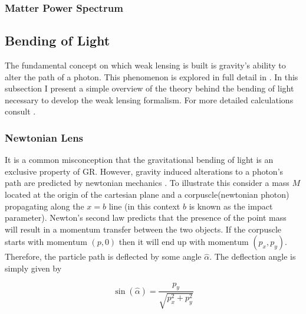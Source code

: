 \subsubsection{Matter Power Spectrum}
\cite{extragalactic}

\subsection{Bending of Light}
The fundamental concept on which weak lensing is built is gravity's ability to alter the path of a photon. This phenomenon is explored in full detail in \cite{GR1,basicLens,Mellier:1998pk}.
In this subsection I present a simple overview of the theory behind the bending of light necessary to develop the weak lensing formalism. For more detailed calculations consult \cite{GR1,basicLens,Mellier:1998pk}.
\subsubsection{Newtonian Lens}
\label{subsec:newtonlens}

It is a common misconception that the gravitational bending of light is an exclusive property of GR.
However, gravity induced alterations to a photon's path are predicted by newtonian mechanics \cite{lensingbook}. To illustrate this 
consider a mass $M$ located at the origin of the cartesian plane and a corpuscle(newtonian photon) 
propagating along the $x=b$ line (in this context $b$ is known as the impact parameter). 
Newton's second law predicts that the presence of the point mass will result in a momentum transfer
between the two objects. If the corpuscle starts with 
momentum $(p,0)$ then it will end up with momentum $(p_x,p_y)$.
Therefore, the particle path is deflected by some angle $\hat{\alpha}$. The deflection angle is 
simply given by 

\begin{equation}
  \sin(\hat{\alpha}) = \frac{p_y}{\sqrt{p_x^2+p_y^2}}
  \label{deflectionnewton}
\end{equation}


